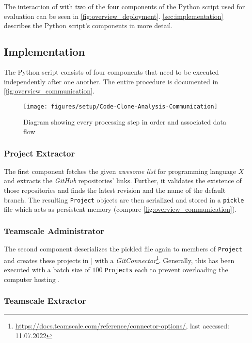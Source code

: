 The interaction of \teamscale{} with two of the four components of the Python script used for evaluation can be seen in \autoref{fig:overview_deployment}. \autoref{sec:implementation} describes the Python script's components in more detail.

\subsection{Implementation}
\label{sec:implementation}

The Python script\gitFootnote{} consists of four components that need to be executed independently after one another. The entire procedure is documented in \autoref{fig:overview_communication}.

\begin{figure}[tbh]
	\centering
	\texttt{[image: figures/setup/Code-Clone-Analysis-Communication]}
	\caption{Diagram showing every processing step in order and associated data flow}
	\label{fig:overview_communication}
\end{figure}

\subsubsection{Project Extractor}

The first component fetches the given \textit{awesome list} for programming language $X$ and extracts the \textit{GitHub} repositories’ links. Further, it validates the existence of those repositories and finds the latest revision and the name of the default branch. The resulting \texttt{Project} objects are then serialized and stored in a \texttt{pickle} file which acts as persistent memory (compare \autoref{fig:overview_communication}).

\subsubsection{Teamscale Administrator}

The second component deserializes the pickled file again to members of \texttt{Project} and creates these projects in \teamscale|{} with a \textit{GitConnector}\footnote{\url{https://docs.teamscale.com/reference/connector-options/}, last accessed: 11.07.2022}. Generally, this has been executed with a batch size of $100$ \texttt{Projects} each to prevent overloading the computer hosting \teamscale{}.

\subsubsection{Teamscale Extractor}

